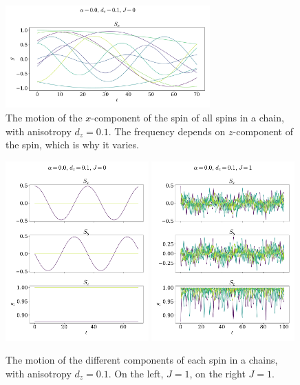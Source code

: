 \documentclass{article}
\begin{document}
    \begin{figure}[H]
        \centering
        \includegraphics[width=0.7\textwidth]{../plots/2221a.pdf}
        \caption{The motion of the $x$-component of the spin of all spins in a chain, with anisotropy $d_z=0.1$. 
        The frequency depends on $z$-component of the spin, which is why it varies.}
        \label{all tilted}
    \end{figure}


    \begin{figure}[H]
        \centering
        \includegraphics[width=0.49\textwidth]{../plots/2221b.pdf}
        \includegraphics[width=0.49\textwidth]{../plots/2222.pdf}
        \caption{The motion of the different components of each spin in a chains, with anisotropy $d_z=0.1$. On the left, $J=1$, on the right $J=1$.}
        \label{one tilted}
    \end{figure}
\end{document}
